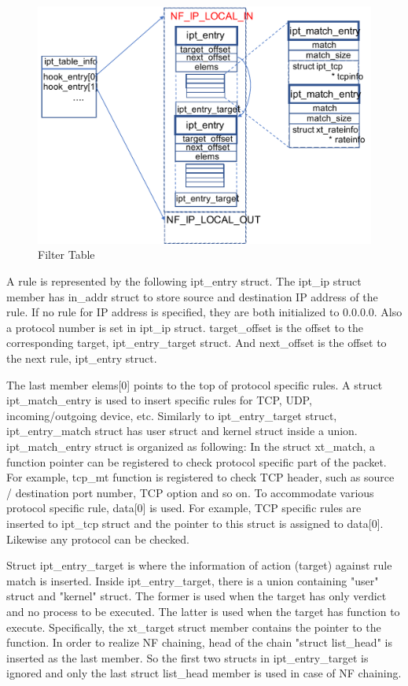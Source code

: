 \begin{figure}
	\centering
	\includegraphics[width=140mm]{pics/filter_table.pdf}
	\caption{Filter Table}
	\label{fig: filter_table}
\end{figure}

A rule is represented by the following ipt\_entry struct. The ipt\_ip struct member has in\_addr struct to store source and destination IP address of the rule. If no rule for IP address is specified, they are both initialized to 0.0.0.0. Also a protocol number is set in ipt\_ip struct. target\_offset is the offset to the corresponding target, ipt\_entry\_target struct. And next\_offset is the offset to the next rule, ipt\_entry struct. 

The last member elems[0] points to the top of protocol specific rules. A struct ipt\_match\_entry is used to insert specific rules for TCP, UDP, incoming/outgoing device, etc. Similarly to ipt\_entry\_target struct, ipt\_entry\_match struct has user struct and kernel struct inside a union. ipt\_match\_entry struct is organized as following:  In the struct xt\_match, a function pointer can be registered to check protocol specific part of the packet. For example, tcp\_mt function is registered to check TCP header, such as source / destination port number, TCP option and so on. To accommodate various protocol specific rule, data[0] is used. For example, TCP specific rules are inserted to ipt\_tcp struct and the pointer to this struct is assigned to data[0]. Likewise any protocol can be checked. 

Struct ipt\_entry\_target is where the information of action (target) against rule match is inserted. Inside ipt\_entry\_target, there is a union containing "user" struct and "kernel" struct. The former is used when the target has only verdict and no process to be executed. The latter is used when the target has function to  execute. Specifically, the xt\_target struct member contains the pointer to the function. In order to realize NF chaining, head of the chain "struct list\_head" is inserted as the last member. So the first two structs in ipt\_entry\_target is ignored and only the last struct list\_head member is used in case of NF chaining. 


